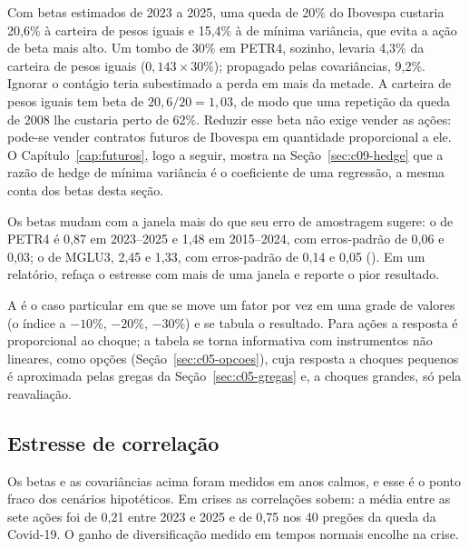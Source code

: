 Com betas estimados de 2023 a 2025, uma queda de 20\% do Ibovespa custaria 20,6\% à carteira de pesos iguais e 15,4\% à de mínima variância, que evita a ação de beta mais alto. Um tombo de 30\% em PETR4, sozinho, levaria 4,3\% da carteira de pesos iguais ($0,143 \times 30\%$); propagado pelas covariâncias, 9,2\%. Ignorar o contágio teria subestimado a perda em mais da metade. A carteira de pesos iguais tem beta de $20,6/20 = 1,03$, de modo que uma repetição da queda de 2008 lhe custaria perto de 62\%. Reduzir esse beta não exige vender as ações: pode-se vender contratos futuros de Ibovespa em quantidade proporcional a ele. O Capítulo~\ref{cap:futuros}, logo a seguir, mostra na Seção~\ref{sec:c09-hedge} que a razão de hedge de mínima variância é o coeficiente de uma regressão, a mesma conta dos betas desta seção.

Os betas mudam com a janela mais do que seu erro de amostragem sugere: o de PETR4 é 0,87 em 2023--2025 e 1,48 em 2015--2024, com erros-padrão de 0,06 e 0,03; o de MGLU3, 2,45 e 1,33, com erros-padrão de 0,14 e 0,05 (). Em um relatório, refaça o estresse com mais de uma janela e reporte o pior resultado.

A  é o caso particular em que se move um fator por vez em uma grade de valores (o índice a $-10\%$, $-20\%$, $-30\%$) e se tabula o resultado. Para ações a resposta é proporcional ao choque; a tabela se torna informativa com instrumentos não lineares, como opções (Seção~\ref{sec:c05-opcoes}), cuja resposta a choques pequenos é aproximada pelas gregas da Seção~\ref{sec:c05-gregas} e, a choques grandes, só pela reavaliação.

\subsection{Estresse de correlação}

Os betas e as covariâncias acima foram medidos em anos calmos, e esse é o ponto fraco dos cenários hipotéticos. Em crises as correlações sobem: a média entre as sete ações foi de 0,21 entre 2023 e 2025 e de 0,75 nos 40 pregões da queda da Covid-19. O ganho de diversificação medido em tempos normais encolhe na crise.

